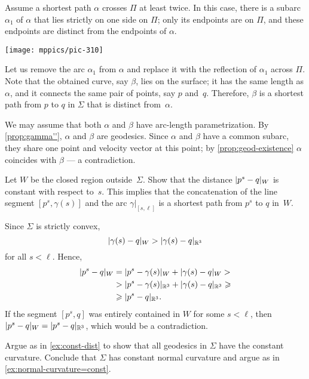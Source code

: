 \begin{multicols}{2}
Assume a shortest path $\alpha$ crosses $\Pi$ at least twice.
In this case, there is a subarc $\alpha_1$ of $\alpha$ that lies strictly on one side on $\Pi$;
only its endpoints are on $\Pi$, and these endpoints are distinct from the endpoints of $\alpha$.
 
\begin{Figure}
\vskip-1mm
\centering
\texttt{[image: mppics/pic-310]}
\vskip-1mm
\end{Figure}

Let us remove the arc $\alpha_1$ from $\alpha$ and replace it with the reflection of $\alpha_1$ across $\Pi$.
Note that the obtained curve, say $\beta$, lies on the surface;
it has the same length as $\alpha$, and it connects the same pair of points, say $p$ and~$q$.
Therefore, $\beta$ is a shortest path from $p$ to $q$ in $\Sigma$ that is distinct from~$\alpha$.

We may assume that both $\alpha$ and $\beta$ have arc-length parametrization.
By \ref{prop:gamma''}, $\alpha$ and $\beta$ are geodesics.
Since $\alpha$ and $\beta$ have a common subarc, they share one point and velocity vector at this point;
by \ref{prop:geod-existence} $\alpha$ coincides with $\beta$ --- a contradiction.


Let $W$ be the closed region outside~$\Sigma$.
Show that the distance $\dist{p^s}{q}W$ is constant with respect to~$s$.
This implies that the concatenation of the line segment $[p^s,\gamma(s)]$ and the arc $\gamma|_{[s,\ell]}$ is a shortest path from $p^s$ to $q$ in~$W$.

Since $\Sigma$ is strictly convex, 
\[ \dist{\gamma (s)}{q}W > \dist{\gamma(s)}{q}{\mathbb{R}^3} \]
for all $s < \ell$.
Hence,
\begin{align*}
\dist{p^s}{q}W&=\dist{p^s}{\gamma(s)}W+\dist{\gamma (s)}{q}W 
> 
\\
&>\dist{p^s}{\gamma(s)}{\mathbb{R}^3} + \dist{ \gamma (s)}{q}{\mathbb{R}^3} 
\ge
\\
&\ge\dist{p^s}{q}{\mathbb{R}^3}. 
\end{align*}
If the segment $[p^s,q]$ was entirely contained in $W$ for some $s<\ell$, then $\dist{p^s}{q}W = \dist{p^s}{q}{\mathbb{R}^3} $, which would be a contradiction.

Argue as in \ref{ex:const-dist} to show that all geodesics in $\Sigma$ have the constant curvature.
Conclude that $\Sigma$ has constant normal curvature and argue as in \ref{ex:normal-curvature=const}.


\end{multicols}
